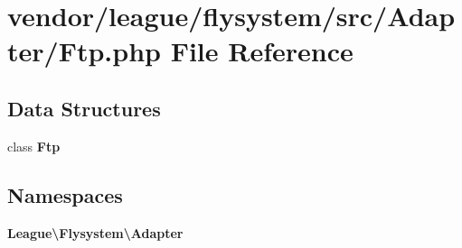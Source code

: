 \section{vendor/league/flysystem/src/\+Adapter/\+Ftp.php File Reference}
\label{_ftp_8php}
\subsection*{Data Structures}
\begin{DoxyCompactItemize}
\item 
class {\bf Ftp}
\end{DoxyCompactItemize}
\subsection*{Namespaces}
\begin{DoxyCompactItemize}
\item 
 {\bf League\textbackslash{}\+Flysystem\textbackslash{}\+Adapter}
\end{DoxyCompactItemize}
